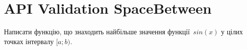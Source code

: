 \documentclass[12pt]{article}
\begin{document}
\section*{API Validation SpaceBetween}

Написати функцію, що знаходить найбільше значення функції~$sin(x)$ у цілих точках інтервалу $[a; b)$.


\end{document}
